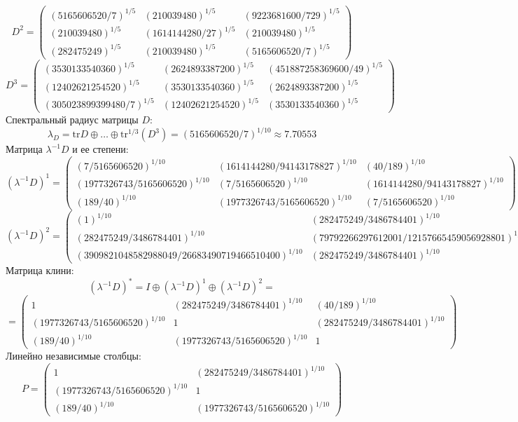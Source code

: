 $$D^2 = \begin{pmatrix}
(5165606520/7)^{1/5} & (210039480)^{1/5} & (9223681600/729)^{1/5}\\
(210039480)^{1/5} & (1614144280/27)^{1/5} & (210039480)^{1/5}\\
(282475249)^{1/5} & (210039480)^{1/5} & (5165606520/7)^{1/5}
\end{pmatrix}
$$
$$D^3 = \begin{pmatrix}
(3530133540360)^{1/5} & (2624893387200)^{1/5} & (451887258369600/49)^{1/5}\\
(12402621254520)^{1/5} & (3530133540360)^{1/5} & (2624893387200)^{1/5}\\
(305023899399480/7)^{1/5} & (12402621254520)^{1/5} & (3530133540360)^{1/5}
\end{pmatrix}
$$
Спектральный радиус матрицы $D$:
$$\lambda_{D} = \mathrm{tr}D\oplus \dots \oplus \mathrm{tr}^{1/3}(D^{3}) = (5165606520/7)^{1/10} \approx 7.70553$$
Матрица $\lambda^{-1}D$ и ее степени:
$$(\lambda^{-1}D)^1 = \begin{pmatrix}
(7/5165606520)^{1/10} & (1614144280/94143178827)^{1/10} & (40/189)^{1/10}\\
(1977326743/5165606520)^{1/10} & (7/5165606520)^{1/10} & (1614144280/94143178827)^{1/10}\\
(189/40)^{1/10} & (1977326743/5165606520)^{1/10} & (7/5165606520)^{1/10}
\end{pmatrix}
$$
$$(\lambda^{-1}D)^2 = \begin{pmatrix}
(1)^{1/10} & (282475249/3486784401)^{1/10} & (2605461756656718400/8862938119652501095929)^{1/10}\\
(282475249/3486784401)^{1/10} & (79792266297612001/12157665459056928801)^{1/10} & (282475249/3486784401)^{1/10}\\
(3909821048582988049/26683490719466510400)^{1/10} & (282475249/3486784401)^{1/10} & (1)^{1/10}
\end{pmatrix}
$$
Матрица клини:
$$(\lambda^{-1}D)^* = I \oplus (\lambda^{-1}D)^1 \oplus (\lambda^{-1}D)^2 = $$
$$ = \begin{pmatrix}
1 & (282475249/3486784401)^{1/10} & (40/189)^{1/10}\\
(1977326743/5165606520)^{1/10} & 1 & (282475249/3486784401)^{1/10}\\
(189/40)^{1/10} & (1977326743/5165606520)^{1/10} & 1
\end{pmatrix}
$$
Линейно независимые столбцы:
$$P = \begin{pmatrix}
1 & (282475249/3486784401)^{1/10}\\
(1977326743/5165606520)^{1/10} & 1\\
(189/40)^{1/10} & (1977326743/5165606520)^{1/10}
\end{pmatrix}
$$
